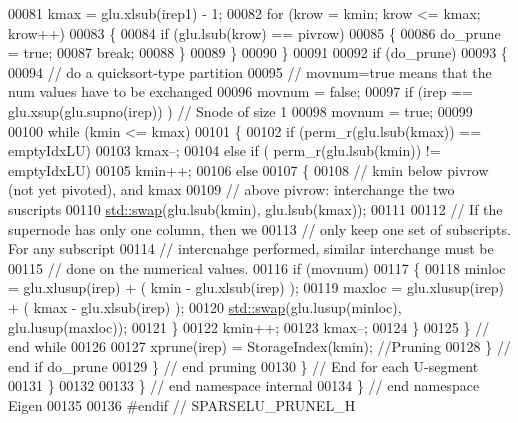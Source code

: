 \begin{DoxyCode}
00081         kmax = glu.xlsub(irep1) - 1; 
00082         \textcolor{keywordflow}{for} (krow = kmin; krow <= kmax; krow++)
00083         \{
00084           \textcolor{keywordflow}{if} (glu.lsub(krow) == pivrow) 
00085           \{
00086             do\_prune = \textcolor{keyword}{true}; 
00087             \textcolor{keywordflow}{break}; 
00088           \}
00089         \}
00090       \}
00091       
00092       \textcolor{keywordflow}{if} (do\_prune) 
00093       \{
00094         \textcolor{comment}{// do a quicksort-type partition}
00095         \textcolor{comment}{// movnum=true means that the num values have to be exchanged}
00096         movnum = \textcolor{keyword}{false}; 
00097         \textcolor{keywordflow}{if} (irep == glu.xsup(glu.supno(irep)) ) \textcolor{comment}{// Snode of size 1 }
00098           movnum = \textcolor{keyword}{true}; 
00099         
00100         \textcolor{keywordflow}{while} (kmin <= kmax)
00101         \{
00102           \textcolor{keywordflow}{if} (perm\_r(glu.lsub(kmax)) == emptyIdxLU)
00103             kmax--; 
00104           \textcolor{keywordflow}{else} \textcolor{keywordflow}{if} ( perm\_r(glu.lsub(kmin)) != emptyIdxLU)
00105             kmin++;
00106           \textcolor{keywordflow}{else} 
00107           \{
00108             \textcolor{comment}{// kmin below pivrow (not yet pivoted), and kmax}
00109             \textcolor{comment}{// above pivrow: interchange the two suscripts}
00110             \hyperlink{endian_8c_a3ca5ecd34b04d6a243c054ac3a57f68d}{std::swap}(glu.lsub(kmin), glu.lsub(kmax)); 
00111             
00112             \textcolor{comment}{// If the supernode has only one column, then we }
00113             \textcolor{comment}{// only keep one set of subscripts. For any subscript}
00114             \textcolor{comment}{// intercnahge performed, similar interchange must be }
00115             \textcolor{comment}{// done on the numerical values. }
00116             \textcolor{keywordflow}{if} (movnum) 
00117             \{
00118               minloc = glu.xlusup(irep) + ( kmin - glu.xlsub(irep) ); 
00119               maxloc = glu.xlusup(irep) + ( kmax - glu.xlsub(irep) ); 
00120               \hyperlink{endian_8c_a3ca5ecd34b04d6a243c054ac3a57f68d}{std::swap}(glu.lusup(minloc), glu.lusup(maxloc)); 
00121             \}
00122             kmin++;
00123             kmax--;
00124           \}
00125         \} \textcolor{comment}{// end while }
00126         
00127         xprune(irep) = StorageIndex(kmin);  \textcolor{comment}{//Pruning }
00128       \} \textcolor{comment}{// end if do\_prune }
00129     \} \textcolor{comment}{// end pruning }
00130   \} \textcolor{comment}{// End for each U-segment}
00131 \}
00132 
00133 \} \textcolor{comment}{// end namespace internal}
00134 \} \textcolor{comment}{// end namespace Eigen}
00135 
00136 \textcolor{preprocessor}{#endif // SPARSELU\_PRUNEL\_H}
\end{DoxyCode}
